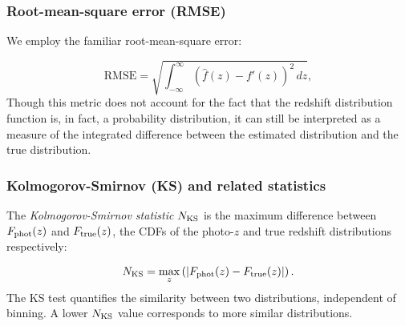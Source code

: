 \subsubsection{Root-mean-square error (RMSE)}
\label{sec:rmse}

We employ the familiar root-mean-square error:

\begin{equation}
\mathrm{RMSE} = \sqrt{\int_{-\infty}^{\infty}\left(\hat{f}(z)-f'(z)\right)^{2}\,dz},
\end{equation}
Though this metric does not account for the fact that the redshift distribution function is, in fact, a probability distribution, it can still be interpreted as a measure of the integrated difference between the estimated distribution and the true distribution.%


\subsubsection{Kolmogorov-Smirnov (KS) and related statistics}
\label{sec:ks}

The \textit{Kolmogorov-Smirnov statistic} $N_{\rm KS}$ is the maximum difference between $F_{\rm phot}(z)$ and $F_{\rm true}(z)$, the CDFs of the photo-$z$ and true redshift distributions respectively:

\begin{equation}
N_{\rm KS} = \max_{z}\left( \left| F_{\rm phot}(z) - F_{\rm true}(z) \right| \right).
\end{equation}
The KS test quantifies the similarity between two distributions, independent of binning.
A lower $N_{\rm KS}$ value corresponds to more similar distributions.

